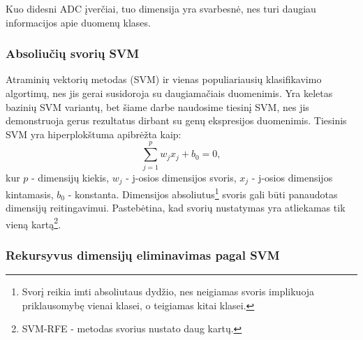 Kuo didesni ADC įverčiai, tuo dimensija yra svarbesnė, nes turi daugiau
informacijos apie duomenų klases.

\subsubsection{Absoliučių svorių SVM}

Atraminių vektorių metodas (SVM) ir vienas populiariausių klasifikavimo algortimų,
nes jis gerai susidoroja su daugiamačiais duomenimis. Yra keletas bazinių 
SVM variantų, bet šiame darbe naudosime tiesinį SVM, nes jis demonstruoja
gerus rezultatus dirbant su genų ekspresijos duomenimis. Tiesinis SVM yra
hiperplokštuma apibrėžta kaip:
\begin{equation}
 \sum_{j=1}^{p}{w_jx_j + b_0 = 0},
\end{equation}
kur $p$ - dimensijų kiekis, $w_j$ - j-osios dimensijos svoris, $x_j$ - j-osios
dimensijos kintamasis, $b_0$ - konstanta. Dimensijos absoliutus\footnote{Svorį
reikia imti absoliutaus dydžio, nes neigiamas svoris implikuoja priklausomybę 
vienai klasei, o teigiamas kitai klasei.} svoris gali būti panaudotas
dimensijų reitingavimui. Pastebėtina, kad svorių nustatymas yra atliekamas tik 
vieną kartą\footnote{SVM-RFE - metodas svorius nustato daug kartų.}.

\subsubsection{Rekursyvus dimensijų eliminavimas pagal SVM}

